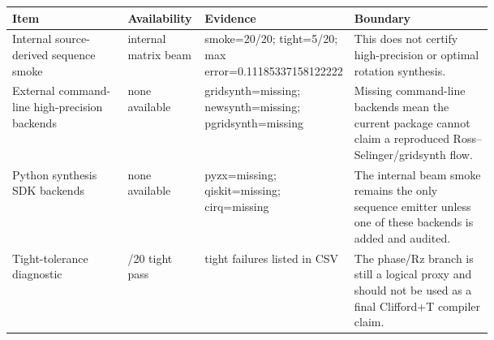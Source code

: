 \begin{tabularx}{\linewidth}{>{\raggedright\arraybackslash}p{0.24\linewidth}>{\raggedright\arraybackslash}p{0.16\linewidth}>{\raggedright\arraybackslash}p{0.29\linewidth}>{\raggedright\arraybackslash}X}
\toprule
Item & Availability & Evidence & Boundary \\
\midrule
Internal source-derived sequence smoke & internal matrix beam & smoke=20/20; tight=5/20; max error=0.11185337158122222 & This does not certify high-precision or optimal rotation synthesis. \\
External command-line high-precision backends & none available & gridsynth=missing; newsynth=missing; pgridsynth=missing & Missing command-line backends mean the current package cannot claim a reproduced Ross--Selinger/gridsynth flow. \\
Python synthesis SDK backends & none available & pyzx=missing; qiskit=missing; cirq=missing & The internal beam smoke remains the only sequence emitter unless one of these backends is added and audited. \\
Tight-tolerance diagnostic & 5/20 tight pass & 15 tight failures listed in CSV & The phase/Rz branch is still a logical proxy and should not be used as a final Clifford+T compiler claim. \\
\bottomrule
\end{tabularx}
